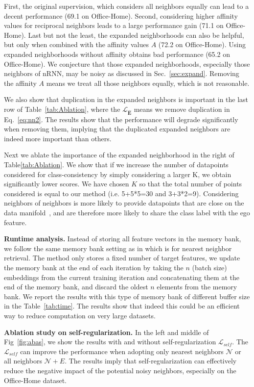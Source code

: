 \documentclass{article}
\begin{document}
First, the original supervision, which considers all neighbors equally can lead to a decent performance (69.1 on Office-Home). 
Second, considering higher affinity values for reciprocal neighbors leads to a large performance gain (71.1 on Office-Home). Last but not the least, the expanded neighborhoods can also be helpful, but only when combined with the affinity values $A$ (72.2 on Office-Home). 
Using expanded neighborhoods without affinity obtains bad performance (65.2 on Office-Home). We conjecture that those expanded neighborhoods, especially those neighbors of nRNN, may be noisy as discussed in Sec.~\ref{sec:expand}. Removing the affinity $A$ means we treat all those neighbors equally, which is not reasonable.


We also show that duplication in the expanded neighbors is important in the last row of Table~\ref{tab:Ablation}, where the $\mathcal{L}_{\bm{\hat{E}}}$ means we remove duplication in Eq.~\ref{eq:nn2}. The results show that the performance will degrade significantly when removing them, implying that the duplicated expanded neighbors are indeed more important than others.


Next we ablate the importance of the expanded neighborhood in the right of Table\ref{tab:Ablation}. We show that if we increase the number of datapoints considered for class-consistency by simply considering a larger K, we obtain significantly lower scores. We have chosen $K$ so that the total number of points considered is equal to our method (i.e. 5+5*5=30 and 3+3*2=9).
Considering neighbors of neighbors is more likely to provide datapoints that are close on the data manifold~\cite{tenenbaum2000global}, and are therefore more likely to share the class label with the ego feature. 


{\noindent \textbf{Runtime analysis.}  Instead of storing all feature vectors in the memory bank, we follow the same memory bank setting as in \cite{dwibedi2021little} which is for nearest neighbor retrieval. The method only stores a fixed number of target features, we update the memory bank at the end of each iteration by taking the $n$ (batch size) embeddings from the current training iteration and concatenating them at the end of the memory bank, and discard the oldest $n$ elements from the memory bank. We report the results with this type of memory bank of different buffer size in the Table~\ref{tab:time}. The results show that indeed this could be an efficient way to reduce computation on very large datasets.}

\noindent \textbf{Ablation study on self-regularization.} In the left and middle of Fig~\ref{fig:abas}, we show the results with and without self-regularization $\mathcal{L}_{self}$. The $\mathcal{L}_{self}$ can improve the performance when adopting only nearest neighbors $\mathcal{N}$ or all neighbors $\mathcal{N}+E$. The results imply that self-regularization can effectively reduce the negative impact of the potential noisy neighbors, especially on the Office-Home dataset.
\end{document}
